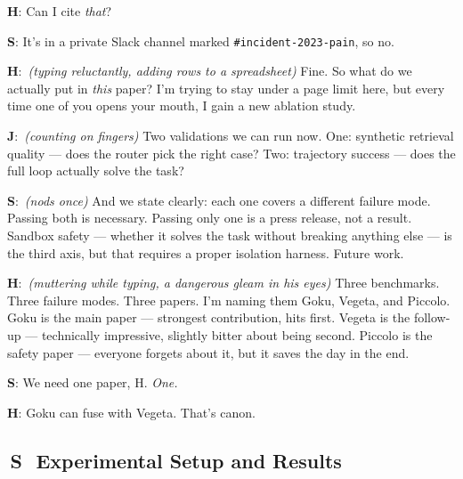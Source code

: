 \documentclass[11pt,a4paper]{article}
\newcommand{\J}[0]{{\sffamily\bfseries\color{marginJ}J}}
\newcommand{\Hstudent}[0]{{\sffamily\bfseries\color{marginH}H}}
\newcommand{\Senior}[0]{{\sffamily\bfseries\color{marginS}S}}
\newcommand{\stage}[1]{{\small\itshape\color{black!50}(#1)}}
\newcommand{\Stag}{{\sffamily\bfseries\colorbox{sharedBG}{\color{black!60}\,S\,}}}
\begin{document}
\begin{dialogue}
\vspace{4pt}
\Hstudent: Can I cite \textit{that}?

\vspace{4pt}
\Senior: It's in a private Slack channel marked \texttt{\#incident-2023-pain}, so no.

\vspace{4pt}
\Hstudent:~\stage{typing reluctantly, adding rows to a spreadsheet} Fine. So what do we actually put in \textit{this} paper? I'm trying to stay under a page limit here, but every time one of you opens your mouth, I gain a new ablation study.

\vspace{4pt}
\J:~\stage{counting on fingers} Two validations we can run now. One: synthetic retrieval quality --- does the router pick the right case? Two: trajectory success --- does the full loop actually solve the task?

\vspace{4pt}
\Senior:~\stage{nods once} And we state clearly: each one covers a different failure mode. Passing both is necessary. Passing only one is a press release, not a result. Sandbox safety --- whether it solves the task without breaking anything else --- is the third axis, but that requires a proper isolation harness. Future work.

\vspace{4pt}
\Hstudent:~\stage{muttering while typing, a dangerous gleam in his eyes} Three benchmarks. Three failure modes. Three papers. I'm naming them Goku, Vegeta, and Piccolo. Goku is the main paper --- strongest contribution, hits first. Vegeta is the follow-up --- technically impressive, slightly bitter about being second. Piccolo is the safety paper --- everyone forgets about it, but it saves the day in the end.

\vspace{4pt}
\Senior: We need one paper, H. \textit{One.}

\vspace{4pt}
\Hstudent: Goku can fuse with Vegeta. That's canon.
\end{dialogue}







\subsection{\Stag~Experimental Setup and Results}
\label{sec:benchmarks}
\end{document}
